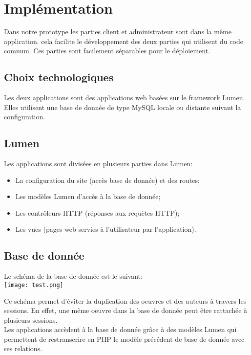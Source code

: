 \documentclass[a4paper]{article}
\begin{document}
\newpage
\section{Implémentation}
Dans notre prototype les parties client et administrateur sont dans la même application. cela facilite le développement des deux parties qui utilisent du code commun. Ces parties sont facilement séparables pour le déploiement.
\subsection{Choix technologiques}
Les deux applications sont des applications web basées sur le framework Lumen. Elles utilisent une base de donnée de type MySQL locale ou distante suivant la configuration.

\subsection{Lumen}
Les applications sont divisées en plusieurs parties dans Lumen:
\begin{itemize}
\item La configuration du site (accès base de donnée) et des routes;
\item Les modèles Lumen d'accès à la base de donnée;
\item Les contrôleurs HTTP (réponses aux requètes HTTP);
\item Les vues (pages web servies à l'utilisateur par l'application).
\end{itemize}

\subsection{Base de donnée}
Le schéma de la base de donnée est le suivant:\\
\newline
\texttt{[image: test.png]}

Ce schéma permet d'éviter la duplication des oeuvres et des auteurs à travers les sessions. En effet, une même oeuvre dans la base de donnée peut être rattachée à plusieurs sessions.\\
Les applications accèdent à la base de donnée grâce à des modèles Lumen qui permettent de restranscrire en PHP le modèle précédent de base de donnée avec ses relations.
\end{document}
